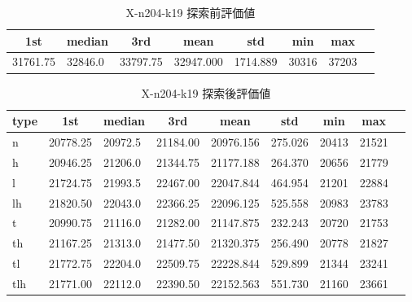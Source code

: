 \begin{table}[htbp]
    \caption{X-n204-k19 探索前評価値}
    \begin{tabular}{|l|l|l|l|l|l|l|l|}\hline
    \multicolumn{1}{|c|}{\textbf{1st}}
    &\multicolumn{1}{c|}{\textbf{median}}
    &\multicolumn{1}{c|}{\textbf{3rd}}
    &\multicolumn{1}{c|}{\textbf{mean}}
    &\multicolumn{1}{c|}{\textbf{std}}
    &\multicolumn{1}{c|}{\textbf{min}}
    &\multicolumn{1}{c|}{\textbf{max}}\\\hline
	31761.75 & 32846.0 & 33797.75 & 32947.000 & 1714.889 & 30316 & 37203\\\hline
	\end{tabular}
\end{table}
\begin{table}[htbp]
    \caption{X-n204-k19 探索後評価値}
    \begin{tabular}{|l|l|l|l|l|l|l|l|l|}\hline
    \multicolumn{1}{|c|}{\textbf{type}}
    &\multicolumn{1}{|c|}{\textbf{1st}}
    &\multicolumn{1}{c|}{\textbf{median}}
    &\multicolumn{1}{c|}{\textbf{3rd}}
    &\multicolumn{1}{c|}{\textbf{mean}}
    &\multicolumn{1}{c|}{\textbf{std}}
    &\multicolumn{1}{c|}{\textbf{min}}
    &\multicolumn{1}{c|}{\textbf{max}}\\\hline
	n & 20778.25 & 20972.5 & 21184.00 & 20976.156 & 275.026 & 20413 & 21521\\\hline
	h & 20946.25 & 21206.0 & 21344.75 & 21177.188 & 264.370 & 20656 & 21779\\\hline
	l & 21724.75 & 21993.5 & 22467.00 & 22047.844 & 464.954 & 21201 & 22884\\\hline
	lh & 21820.50 & 22043.0 & 22366.25 & 22096.125 & 525.558 & 20983 & 23783\\\hline
	t & 20990.75 & 21116.0 & 21282.00 & 21147.875 & 232.243 & 20720 & 21753\\\hline
	th & 21167.25 & 21313.0 & 21477.50 & 21320.375 & 256.490 & 20778 & 21827\\\hline
	tl & 21772.75 & 22204.0 & 22509.75 & 22228.844 & 529.899 & 21344 & 23241\\\hline
	tlh & 21771.00 & 22112.0 & 22390.50 & 22152.563 & 551.730 & 21160 & 23661\\\hline
	\end{tabular}
\end{table}
